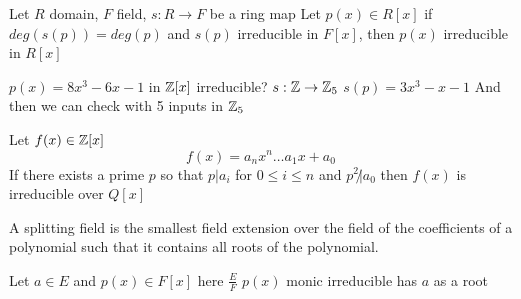 
\begin{theorem}
	\label{thm:mod p-criterion}
	Let \(R\) domain, \(F\) field, \(s: R \to F\) be a ring map Let \(p(x) \in R[x]\) if \(deg(s(p)) = deg(p)\) and \(s(p)\) irreducible in \(F[x]\), then \(p(x)\) irreducible in \(R[x]\)
\end{theorem}
\begin{example}
	\(p(x)=8x^3 - 6x - 1\) in \(\mathbb{Z}[x]\) irreducible?
	\(s: \mathbb{Z} \to \mathbb{Z}_5\)
	\(s(p) = 3x^3 - x - 1\) And then we can check with 5 inputs in \(\mathbb{Z}_5\)
\end{example}

\begin{theorem}
	\label{thm:eisenstein criterion}
	Let \(f(x) \in \mathbb{Z} [x]\)
	\[
		f(x) = a_{n} x^n \ldots a_1 x + a_0  
	\]
	If there exists a prime \(p\) so that \(p|a_i\) for \(0 \leq i \leq n\) and \(p^2 \not | a_0\) then \(f(x)\) is irreducible over \(Q[x]\)
\end{theorem}

\begin{definition}
	\label{def:splitting field}
	A splitting field is the smallest field extension over the field of the coefficients of a polynomial such that it contains all roots of the polynomial.
\end{definition}  

\begin{theorem}
	Let \(a \in E\) and \(p(x) \in F[x]\) here \(\frac{E}{F}\) \(p(x)\) monic irreducible has \(a\) as a root
\end{theorem} 

